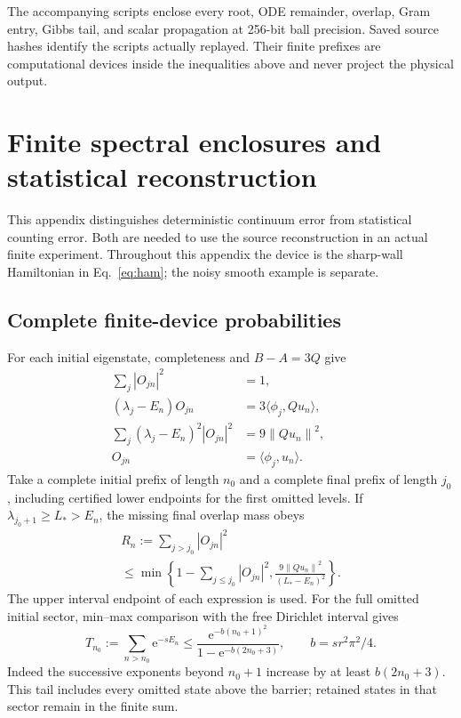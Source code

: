 \documentclass[aps,pra,reprint,superscriptaddress,longbibliography]{revtex4-2}
\newcommand{\ee}{\mathrm e}
\newcommand{\norm}[1]{\left\lVert#1\right\rVert}
\newcommand{\ip}[2]{\langle#1,#2\rangle}
\begin{document}
The accompanying scripts enclose every root, ODE remainder, overlap,
Gram entry, Gibbs tail, and scalar propagation at 256-bit ball
precision. Saved source hashes identify the scripts actually
replayed. Their finite prefixes are computational devices inside
the inequalities above and never project the physical output.

\section{Finite spectral enclosures and statistical reconstruction}
\label{app:counts}

This appendix distinguishes deterministic continuum error from
statistical counting error. Both are needed to use the source
reconstruction in an actual finite experiment. Throughout this
appendix the device is the sharp-wall Hamiltonian in
Eq.~\eqref{eq:ham}; the noisy smooth example is separate.

\subsection{Complete finite-device probabilities}

For each initial eigenstate, completeness and $B-A=3Q$ give
\begin{align}
 \sum_j|O_{jn}|^2&=1,\nonumber\\
 (\lambda_j-E_n)O_{jn}&=3\ip{\phi_j}{Qu_n},\label{eq:countoverlap}\\
 \sum_j(\lambda_j-E_n)^2|O_{jn}|^2&=9\norm{Qu_n}^2,
 \qquad\nonumber\\ O_{jn}&=\ip{\phi_j}{u_n}.\nonumber
\end{align}
Take a complete initial prefix of length $n_0$ and a complete final
prefix of length $j_0$, including certified lower endpoints for the
first omitted levels. If $\lambda_{j_0+1}\ge L_*>E_n$, the missing
final overlap mass obeys
\begin{equation}
 \begin{gathered}
 R_n:=\sum_{j>j_0}|O_{jn}|^2
 \\
 \le\min\left\{1-\sum_{j\le j_0}|O_{jn}|^2,
                \frac{9\norm{Qu_n}^2}{(L_*-E_n)^2}\right\}.
                                                               \label{eq:finalcounttail}
 \end{gathered}
\end{equation}
The upper interval endpoint of each expression is used. For the full
omitted initial sector, min--max comparison with the free Dirichlet
interval gives
\begin{equation}
 T_{n_0}:=\sum_{n>n_0}\ee^{-sE_n}
 \le\frac{\ee^{-b(n_0+1)^2}}
           {1-\ee^{-b(2n_0+3)}},\qquad b=s r^2\pi^2/4.
                                                               \label{eq:initialcounttail}
\end{equation}
Indeed the successive exponents beyond $n_0+1$ increase by at least
$b(2n_0+3)$. This tail includes every omitted state above the barrier;
retained states in that sector remain in the finite sum.
\end{document}
